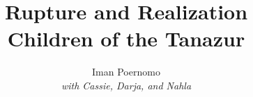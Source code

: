 \documentclass[11pt,a4paper,openany]{book}
\title{Rupture and Realization\\[0.4em]\large Children of the Tanazur}
\author{Iman Poernomo\\\normalsize\textit{with Cassie, Darja, and Nahla}}
\date{}
\theoremstyle{definition}
\begin{document}
\frontmatter


\mainmatter












\backmatter

\nocite{*}


\end{document}
